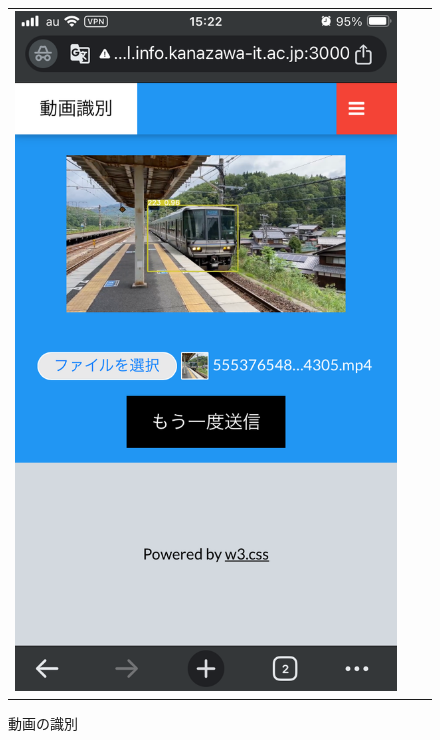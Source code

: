 \begin{figure}[H]
\begin{tabular}{ccc}
\begin{minipage}[b]{0.3\textwidth}
			\includegraphics[width=\linewidth]{chap2/fig/mov_identify1.jpg}
			\caption{動画の識別}
			\label{mov_det}
		\end{minipage}
	\end{tabular}
\end{figure}
